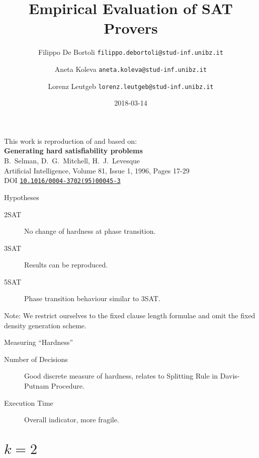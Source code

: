 \documentclass[xcolor={table,usenames,dvipsnames},aspectratio=169]{beamer}
\title{Empirical Evaluation of SAT Provers}
\author{Filippo De Bortoli \texorpdfstring{\newline \texttt{\tiny filippo.debortoli@stud-inf.unibz.it} \newline }{<filippo.debortoli@stud-inf.unibz.it>}%
\and Aneta Koleva \texorpdfstring{\newline \texttt{\tiny aneta.koleva@stud-inf.unibz.it} \newline}{<aneta.koleva@stud-inf.unibz.it>}%
\and Lorenz Leutgeb \texorpdfstring{\newline \texttt{\tiny lorenz.leutgeb@stud-inf.unibz.it} \newline}{<lorenz.leutgeb@stud-inf.unibz.it>}}
\institute{Free University of Bozen-Bolzano}
\date{2018-03-14}
\begin{document}
\begin{frame}[plain]
\maketitle
\end{frame}

\begin{frame}[plain]
This work is reproduction of and based on:\\[6mm]

{\large\bfseries Generating hard satisfiability problems}\\[1mm]
B.\ Selman, D.\ G.\ Mitchell, H.\ J.\ Levesque\\[2mm]
Artificial Intelligence, Volume 81, Issue 1, 1996, Pages 17-29\\[1mm]
DOI \href{http://dx.doi.org/10.1016/0004-3702(95)00045-3}{\texttt{10.1016/0004-3702(95)00045-3}}
\end{frame}

\begin{frame}{Hypotheses}
\begin{description}
	\item[2SAT]{No change of hardness at phase transition.}
	\item[3SAT]{Results can be reproduced.}
	\item[5SAT]{Phase transition behaviour similar to 3SAT.}
\end{description}

\alert{Note:} We restrict ourselves to the fixed clause length formulae and omit the fixed density generation scheme.
\end{frame}

\begin{frame}{Measuring \enquote{Hardness}}
\begin{description}
	\item[Number of Decisions]{Good discrete measure of hardness, relates to \alert{Splitting Rule}  in Davis-Putnam Procedure.}
	\item[Execution Time]{Overall indicator, more fragile.}
\end{description}
\end{frame}

\section{$k = 2$}

\end{document}
